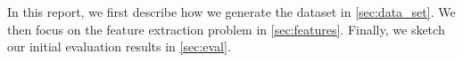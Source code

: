 
In this report, we first describe how we generate the dataset in
\cref{sec:data_set}. We then focus on the feature extraction problem
in \cref{sec:features}.
Finally, we sketch our initial evaluation results in \cref{sec:eval}.
